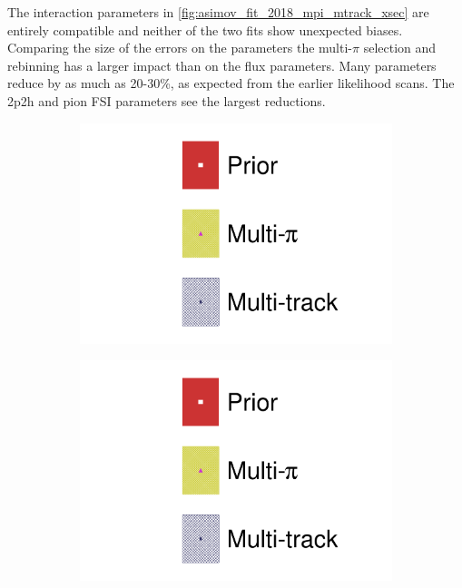 The interaction parameters in \autoref{fig:asimov_fit_2018_mpi_mtrack_xsec} are entirely compatible and neither of the two fits show unexpected biases. Comparing the size of the errors on the parameters the multi-$\pi$ selection and rebinning has a larger impact than on the flux parameters. Many parameters reduce by as much as 20-30\%, as expected from the earlier likelihood scans. The 2p2h and pion FSI parameters see the largest reductions.
\begin{figure}[h]
	\centering
	\begin{subfigure}[t]{0.1\textwidth}
		\includegraphics[width=\textwidth,page=1, trim={0mm 135mm 30mm 0mm}, clip]{figures/mach3/2018/asimov/2018a_FixedCov_RedCov_Mpi_Asimov_merg_2018a_NewDetMatrix_OrderSwitched_Data2to8_merge}
	\end{subfigure}
	\begin{subfigure}[t]{0.1\textwidth}
		\includegraphics[width=\textwidth,page=1, trim={0mm 70mm 30mm 60mm}, clip]{figures/mach3/2018/asimov/2018a_FixedCov_RedCov_Mpi_Asimov_merg_2018a_NewDetMatrix_OrderSwitched_Data2to8_merge}

\end{subfigure}
\end{figure}
